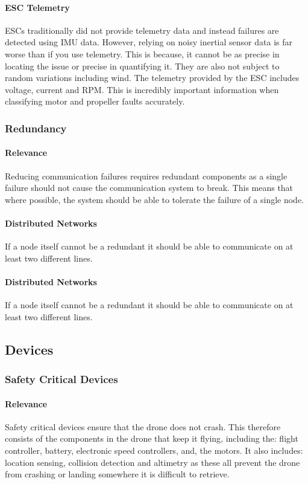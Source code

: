 \paragraph{\gls{ESC} Telemetry}
\gls{ESC}s traditionally did not provide telemetry data and instead failures are detected using \gls{IMU} data. However, relying on noisy inertial sensor data is far worse than if you use telemetry. This is because, it cannot be as precise in locating the issue or precise in quantifying it. They are also not subject to random variations including wind. The telemetry provided by the \gls{ESC} includes voltage, current and \gls{RPM}. This is incredibly important information when classifying motor and propeller faults accurately.  

\subsubsection{Redundancy}
\paragraph{Relevance}
Reducing communication failures requires redundant components as a single failure should not cause the communication system to break. This means that where possible, the system should be able to tolerate the failure of a single node.
\paragraph{Distributed Networks}
If a node itself cannot be a redundant it should be able to communicate on at least two different lines. 
\paragraph{Distributed Networks}
If a node itself cannot be a redundant it should be able to communicate on at least two different lines. 

\subsection{Devices}
\subsubsection{Safety Critical Devices}
\paragraph{Relevance}
Safety critical devices ensure that the drone does not crash. This therefore consists of the components in the drone that keep it flying, including the: flight controller, battery, electronic speed controllers, and, the motors. It also includes: location sensing,  collision detection and altimetry as these all prevent the drone from crashing or landing somewhere it is difficult to retrieve.
